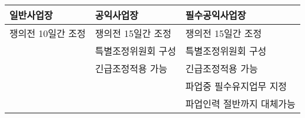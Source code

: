 \begin{tabular}{p{5cm}|p{5cm}|p{5cm}}
\toprule
일반사업장 & 공익사업장 & 필수공익사업장 \\
\midrule
쟁의전 10일간 조정 & 쟁의전 15일간 조정  & 쟁의전 15일간 조정         \\
                   & 특별조정위원회 구성 & 특별조정위원회 구성        \\
                   & 긴급조정적용 가능   & 긴급조정적용 가능          \\
                   &                     & 파업중 필수유지업무 지정   \\
                   &                     & 파업인력 절반까지 대체가능 \\
\bottomrule
\end{tabular}
